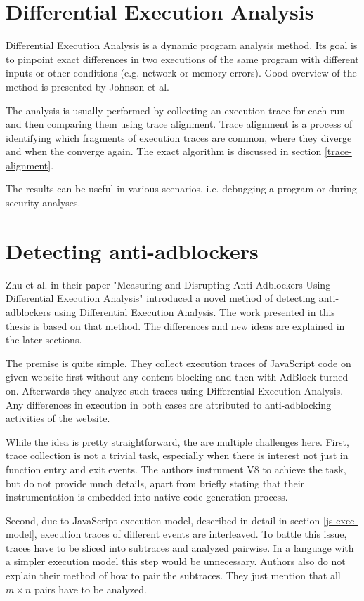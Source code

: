\section{Differential Execution Analysis}
Differential Execution Analysis is a dynamic program analysis method. Its goal is to pinpoint exact differences
in two executions of the same program with different inputs or other conditions (e.g. network or memory errors).
Good overview of the method is presented by Johnson et al. \cite{ieee:alignment-and-slicing}

The analysis is usually performed by collecting an execution trace for each run and then comparing
them using trace alignment. Trace alignment is a process of identifying which fragments of execution traces
are common, where they diverge and when the converge again. The exact algorithm is discussed in section \ref{trace-alignment}.

The results can be useful in various scenarios, i.e. debugging a program or during security analyses.


\section{Detecting anti-adblockers}
Zhu et al. in their paper "Measuring and Disrupting Anti-Adblockers Using Differential Execution Analysis" 
 \cite{DBLP:conf/ndss/ZhuHQSY18} introduced a novel method of detecting anti-adblockers
using Differential Execution Analysis. The work presented in this thesis is based on that method. 
The differences and new ideas are explained in the later sections.

The premise is quite simple. They collect execution traces of JavaScript code on given website
first without any content blocking and then with AdBlock turned on.
Afterwards they analyze such traces using Differential Execution Analysis. Any differences in execution in both cases
are attributed to anti-adblocking activities of the website.

While the idea is pretty straightforward, the are multiple challenges here. 
First, trace collection is not a trivial task, especially when there is interest not just in function entry and exit events.
The authors instrument V8 to achieve the task, but do not provide much details, apart from briefly stating that
their instrumentation is embedded into native code generation process.

Second, due to JavaScript execution model, described in detail in section \ref{js-exec-model}, execution traces of different
events are interleaved. To battle this issue, traces have to be sliced into subtraces and analyzed pairwise.
In a language with a simpler execution model this step would be unnecessary.
Authors also do not explain their method of how to pair the subtraces. They just mention that all $m \times n$ pairs 
have to be analyzed.

